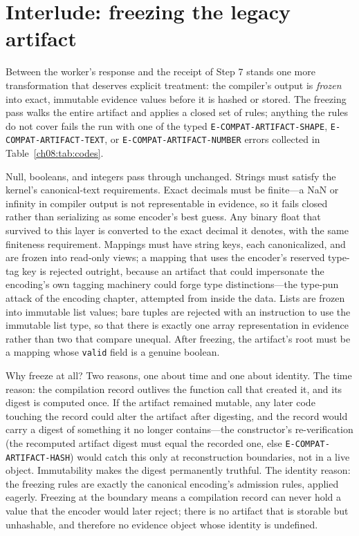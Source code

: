 \section{Interlude: freezing the legacy artifact}\label{ch07:freeze}

Between the worker's response and the receipt of Step 7 stands one more transformation that deserves explicit treatment: the compiler's output is \emph{frozen} into exact, immutable evidence values before it is hashed or stored. The freezing pass walks the entire artifact and applies a closed set of rules; anything the rules do not cover fails the run with one of the typed \texttt{E-COMPAT-ARTIFACT-SHAPE}, \texttt{E-COMPAT-ARTIFACT-TEXT}, or \texttt{E-COMPAT-ARTIFACT-NUMBER} errors collected in Table~\ref{ch08:tab:codes}.

Null, booleans, and integers pass through unchanged. Strings must satisfy the kernel's canonical-text requirements. Exact decimals must be finite---a NaN or infinity in compiler output is not representable in evidence, so it fails closed rather than serializing as some encoder's best guess. Any binary float that survived to this layer is converted to the exact decimal it denotes, with the same finiteness requirement. Mappings must have string keys, each canonicalized, and are frozen into read-only views; a mapping that uses the encoder's reserved type-tag key is rejected outright, because an artifact that could impersonate the encoding's own tagging machinery could forge type distinctions---the type-pun attack of the encoding chapter, attempted from inside the data. Lists are frozen into immutable list values; bare tuples are rejected with an instruction to use the immutable list type, so that there is exactly one array representation in evidence rather than two that compare unequal. After freezing, the artifact's root must be a mapping whose \texttt{valid} field is a genuine boolean.

Why freeze at all? Two reasons, one about time and one about identity. The time reason: the compilation record outlives the function call that created it, and its digest is computed once. If the artifact remained mutable, any later code touching the record could alter the artifact after digesting, and the record would carry a digest of something it no longer contains---the constructor's re-verification (the recomputed artifact digest must equal the recorded one, else \texttt{E-COMPAT-ARTIFACT-HASH}) would catch this only at reconstruction boundaries, not in a live object. Immutability makes the digest permanently truthful. The identity reason: the freezing rules are exactly the canonical encoding's admission rules, applied eagerly. Freezing at the boundary means a compilation record can never hold a value that the encoder would later reject; there is no artifact that is storable but unhashable, and therefore no evidence object whose identity is undefined.

